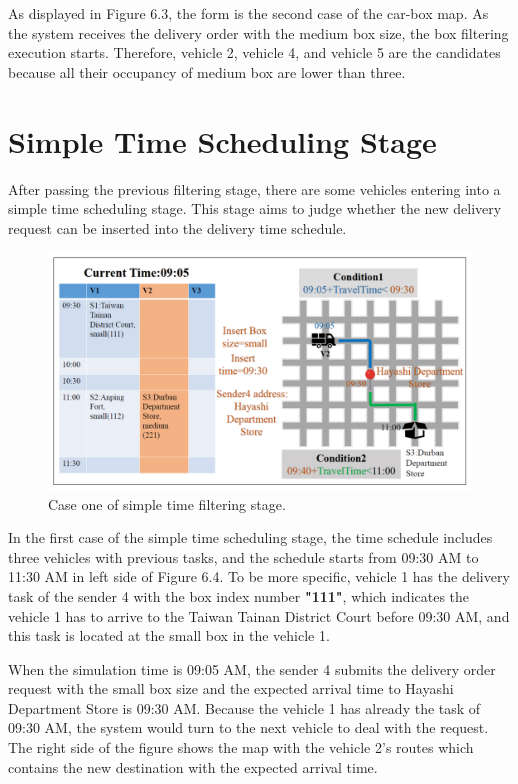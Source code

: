 \documentclass[12pt]{ksthesis}
\begin{document}
\begin{thesis}
{As displayed in Figure 6.3, the form is the second case of the car-box map. As the system receives the delivery order with the medium box size, the box filtering execution starts. Therefore, vehicle 2, vehicle 4, and vehicle 5 are the candidates because all their occupancy of medium box are lower than three.

\section{Simple Time Scheduling Stage}

After passing the previous filtering stage, there are some vehicles entering into a simple time scheduling stage. This stage aims to judge whether the new delivery request can be inserted into the delivery time schedule.

\begin{figure}[H]
\centering
\includegraphics[width=1.0\textwidth]{./Thesis_figures/F6-4_caseOne_SchedulingStage.PNG}
\caption{\large Case one of simple time filtering stage.}
\vspace{0.5cm}
\label{Fig:CaseOne_TimeFiltering}
\end{figure}

In the first case of the simple time scheduling stage, 
the time schedule includes three vehicles with previous tasks, and the schedule starts from 09:30 AM to 11:30 AM in left side of Figure 6.4. To be more specific, vehicle 1 has the delivery task of the sender 4 with the box index number \textbf{"111"}, which indicates the vehicle 1 has to arrive to the Taiwan Tainan District Court before 09:30 AM, and this task is located at the small box in the vehicle 1.

When the simulation time is 09:05 AM, the sender 4 submits the delivery order request with the small box size and the expected arrival time to Hayashi Department Store is 09:30 AM. Because the vehicle 1 has already the task of 09:30 AM, the system would turn to the next vehicle to deal with the request.
The right side of the figure shows the map with the vehicle 2’s routes which contains the new destination with the expected arrival time.

}
\end{thesis}
\end{document}
